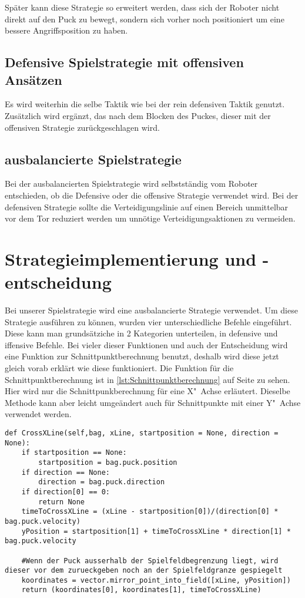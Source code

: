 Später kann diese Strategie so erweitert werden, dass sich der Roboter nicht direkt auf den Puck zu bewegt, sondern sich vorher noch positioniert um eine bessere Angriffsposition zu haben.
\subsection{Defensive Spielstrategie mit offensiven Ansätzen}
Es wird weiterhin die selbe Taktik wie bei der rein defensiven Taktik genutzt. Zusätzlich wird ergänzt, das nach dem Blocken des Puckes, dieser mit der offensiven Strategie zurückgeschlagen wird.

\subsection{ausbalancierte Spielstrategie}
Bei der ausbalancierten Spielstrategie wird selbstständig vom Roboter entschieden, ob die Defensive oder die offensive Strategie verwendet wird. Bei der defensiven Strategie sollte die Verteidigungslinie auf einen Bereich unmittelbar vor dem Tor reduziert werden um unnötige Verteidigungsaktionen zu vermeiden.



\section{Strategieimplementierung und -entscheidung}
Bei unserer Spielstrategie wird eine ausbalancierte Strategie verwendet. Um diese Strategie ausführen zu können, wurden vier unterschiedliche Befehle eingeführt. Diese kann man grundsätziche in 2 Kategorien unterteilen, in defensive und iffensive Befehle. Bei vieler dieser Funktionen und auch der Entscheidung wird eine Funktion zur Schnittpunktberechnung benutzt, deshalb wird diese jetzt gleich vorab erklärt wie diese funktioniert. Die Funktion für die Schnittpunktberechnung ist  in \ref{lst:Schnittpunktberechnung} auf Seite \pageref{lst:Schnittpunktberechnung} zu sehen. Hier wird nur die Schnittpunkberechnung für eine X"~Achse erläutert. Dieselbe Methode kann aber leicht umgeändert auch für Schnittpunkte mit einer Y"~Achse verwendet werden.

\begin{lstlisting}[caption= Python-Funktion für Schnittpunktberechnung, label=lst:Schnittpunktberechnung]
def CrossXLine(self,bag, xLine, startposition = None, direction = None):     
	if startposition == None:
		startposition = bag.puck.position
	if direction == None:
		direction = bag.puck.direction
	if direction[0] == 0:
		return None
	timeToCrossXLine = (xLine - startposition[0])/(direction[0] * bag.puck.velocity)
	yPosition = startposition[1] + timeToCrossXLine * direction[1] * bag.puck.velocity
	
	#Wenn der Puck ausserhalb der Spielfeldbegrenzung liegt, wird dieser vor dem zurueckgeben noch an der Spielfeldgranze gespiegelt
	koordinates = vector.mirror_point_into_field([xLine, yPosition])
	return (koordinates[0], koordinates[1], timeToCrossXLine)
\end{lstlisting}


